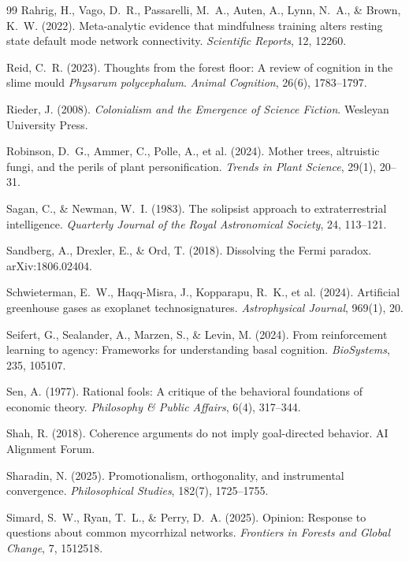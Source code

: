 \documentclass[11pt,a4paper,twocolumn]{article}
\begin{document}
\begin{thebibliography}{99}
 Rahrig, H., Vago, D.~R., Passarelli, M.~A., Auten, A., Lynn, N.~A., \& Brown, K.~W. (2022). Meta-analytic evidence that mindfulness training alters resting state default mode network connectivity. \textit{Scientific Reports}, 12, 12260.

 Reid, C.~R. (2023). Thoughts from the forest floor: A review of cognition in the slime mould \textit{Physarum polycephalum}. \textit{Animal Cognition}, 26(6), 1783--1797.

 Rieder, J. (2008). \textit{Colonialism and the Emergence of Science Fiction}. Wesleyan University Press.

 Robinson, D.~G., Ammer, C., Polle, A., et al. (2024). Mother trees, altruistic fungi, and the perils of plant personification. \textit{Trends in Plant Science}, 29(1), 20--31.

 Sagan, C., \& Newman, W.~I. (1983). The solipsist approach to extraterrestrial intelligence. \textit{Quarterly Journal of the Royal Astronomical Society}, 24, 113--121.

 Sandberg, A., Drexler, E., \& Ord, T. (2018). Dissolving the Fermi paradox. arXiv:1806.02404.

 Schwieterman, E.~W., Haqq-Misra, J., Kopparapu, R.~K., et al. (2024). Artificial greenhouse gases as exoplanet technosignatures. \textit{Astrophysical Journal}, 969(1), 20.

 Seifert, G., Sealander, A., Marzen, S., \& Levin, M. (2024). From reinforcement learning to agency: Frameworks for understanding basal cognition. \textit{BioSystems}, 235, 105107.

 Sen, A. (1977). Rational fools: A critique of the behavioral foundations of economic theory. \textit{Philosophy \& Public Affairs}, 6(4), 317--344.

 Shah, R. (2018). Coherence arguments do not imply goal-directed behavior. AI Alignment Forum.

 Sharadin, N. (2025). Promotionalism, orthogonality, and instrumental convergence. \textit{Philosophical Studies}, 182(7), 1725--1755.

 Simard, S.~W., Ryan, T.~L., \& Perry, D.~A. (2025). Opinion: Response to questions about common mycorrhizal networks. \textit{Frontiers in Forests and Global Change}, 7, 1512518.


\end{thebibliography}
\end{document}
